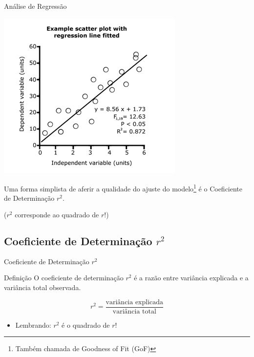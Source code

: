 \documentclass{beamer}
\begin{document}
\begin{frame}{Análise de Regressão}
  \begin{center}
      \includegraphics[height=0.6\textheight]{Cap18-19/residuos2}
  \end{center}
  \begin{center}
    \small
    Uma forma \alert{simplista} de aferir a qualidade do ajuste do modelo\footnote{Também chamada de Goodness of Fit (GoF)} é o Coeficiente de Determinação $r^2$.

    \medskip
    {\scriptsize ($r^2$ corresponde ao quadrado de $r$!)}
  \end{center}
\end{frame}


\subsection[$r^2$]{Coeficiente de Determinação $r^2$}

\begin{frame}{Coeficiente de Determinação $r^2$}
  \begin{block}{Definição}
    \small
    O \alert{coeficiente de determinação} $r^2$ é a razão entre
    variância explicada e a variância total observada.
  \end{block}
  \begin{displaymath}
    r^2 = \frac{\text{variância explicada}}{\text{variância total}}
  \end{displaymath}
  \begin{itemize}
  \item Lembrando: $r^2$ é o quadrado de $r$!
  \end{itemize}
\end{frame}
\end{document}
